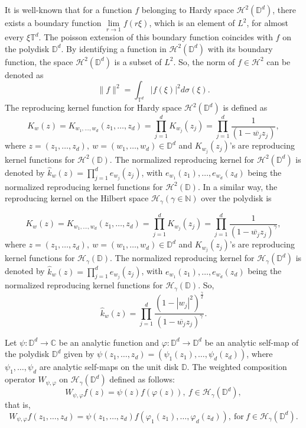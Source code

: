 \documentclass[12pt, reqno]{amsart}
\theoremstyle{definition}
\theoremstyle{remark}
\numberwithin{equation}{section}
\begin{document}
It is well-known that for a function $f$ belonging to Hardy space $\mathcal{H}^2(\mathbb{D}^d)$, there exists a boundary function $\lim\limits_{r\rightarrow 1}f(r\xi)$, which is an element of $L^2$, for almost every $\xi\mathbb{T}^d$. The poisson extension of this boundary function coincides with $f$ on the polydisk $\mathbb{D}^d$. By identifying a function in $\mathcal{H}^2(\mathbb{D}^d)$ with its boundary function, the space $\mathcal{H}^2(\mathbb{D}^d)$ is a subset of $L^2$. So, the norm of $f\in \mathcal{H}^2$ can be denoted as $$\|f\|^2=\int_{\mathbb{T}^d}|f(\xi)|^2d\sigma(\xi).$$ 
The reproducing kernel function for Hardy space $\mathcal{H}^2(\mathbb{D}^d)$ is defined as 
$$K_w(z)=K_{w_1, \dots, w_d}(z_1, \dots, z_d)=\prod_{j=1}^{d}K_{w_j}(z_j)=\prod_{j=1}^{d}\frac{1}{(1-\overline{w_j}z_j)},$$
where $z=(z_1, \dots, z_d), ~w=(w_1, \dots, w_d)\in \mathbb{D}^d$ and $K_{w_j}(z_j)$'s are reproducing kernel functions for $\mathcal{H}^2(\mathbb{D})$. The normalized reproducing kernel for $\mathcal{H}^2(\mathbb{D}^d)$ is denoted by $\widehat{k}_w(z)=\prod_{j=1}^{d}e_{w_j}(z_j)$, with $e_{w_1}(z_1), \dots, e_{w_d}(z_d)$ being the normalized reproducing kernel functions for $\mathcal{H}^2(\mathbb{D})$. In a similar way, the reproducing kernel on the Hilbert space $\mathcal{H}_\gamma (\gamma\in \mathbb{N})$ over the polydisk is 
   
 $$K_w(z)=K_{w_1, \dots, w_d}(z_1, \dots, z_d)=\prod_{j=1}^{d}K_{w_j}(z_j)=\prod_{j=1}^{d}\frac{1}{(1-\overline{w_j}z_j)^\gamma},$$
 where $z=(z_1, \dots, z_d), ~w=(w_1, \dots, w_d)\in \mathbb{D}^d$ and $K_{w_j}(z_j)$'s are reproducing kernel functions for $\mathcal{H}_\gamma(\mathbb{D})$. The normalized reproducing kernel for $\mathcal{H}_\gamma(\mathbb{D}^d)$ is denoted by $\widehat{k}_w(z)=\prod_{j=1}^{d}e_{w_j}(z_j)$, with $e_{w_1}(z_1),  \dots, e_{w_d}(z_d)$ being the normalized reproducing kernel functions for $\mathcal{H}_\gamma(\mathbb{D})$.
 So,
  $$\widehat{k}_w(z)=\prod_{j=1}^{d}\frac{(1-|w_j|^2)^{\frac{\gamma}{2}}}{(1-\overline{w_j}z_j)^\gamma}.$$
  
 
 Let $\psi: \mathbb{D}^d\longrightarrow \mathbb{C}$ be an  analytic function and $\varphi: \mathbb{D}^d\longrightarrow \mathbb{D}^d$ be an analytic self-map of the polydisk $\mathbb{D}^d$ given by $\psi(z_1, \dots, z_d)=(\psi_1(z_1), \dots, \psi_d(z_d))$, where $\psi_1, \dots, \psi_d$ are analytic self-maps on the unit disk $\mathbb{D}$. The weighted composition operator $W_{\psi, \varphi}$ on $\mathcal{H}_\gamma(\mathbb{D}^d)$ defined as follows:
 $$ W_{\psi, \varphi} f(z)=\psi(z)f(\varphi(z)), ~f\in \mathcal{H}_\gamma(\mathbb{D}^d),$$
 that is, 
 $$W_{\psi, \varphi} f(z_1,\dots, z_d)=\psi(z_1,\dots, z_d)f(\varphi_1(z_1), \dots, \varphi_d(z_d)),~\mbox{for}~f\in \mathcal{H}_\gamma(\mathbb{D}^d).$$
 
\end{document}
